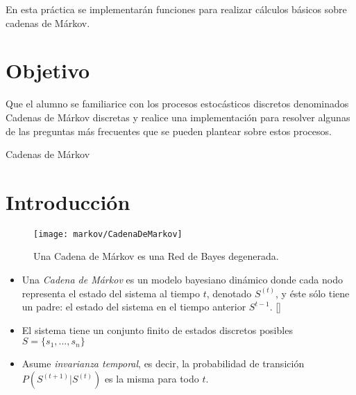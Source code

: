 
En esta práctica se implementarán funciones para realizar cálculos básicos sobre cadenas de Márkov.

\section{Objetivo}

\begin{compactitem}
 \item Que el alumno se familiarice con los procesos estocásticos discretos denominados Cadenas de Márkov discretas y realice una implementación para resolver algunas de las preguntas más frecuentes que se pueden plantear sobre estos procesos. \parencite{gestiondeoperaciones2015}
\end{compactitem}


\begin{auxcode}
 \caption{Cadenas de Márkov}
 \centering
\end{auxcode}


\section{Introducción}

\begin{figure}
 \centering
 \texttt{[image: markov/CadenaDeMarkov]}
 \caption{Una Cadena de Márkov es una Red de Bayes degenerada.}\label{Fig:CadenaDeMarkov}
\end{figure}

\begin{definition}
 \begin{itemize}
  \item Una \emph{Cadena de Márkov} es un modelo bayesiano dinámico donde cada nodo representa el estado del sistema al tiempo $t$, denotado $S^{(t)}$, y éste sólo tiene un padre: el estado del sistema en el tiempo anterior $S^{t-1}$. []

  \item El sistema tiene un conjunto finito de estados discretos posibles $S = \{s_1,...,s_n\}$

  \item Asume \emph{invarianza temporal}, es decir, la probabilidad de transición $P(S^{(t+1)}|S^{(t)})$ es la misma para todo $t$.
 \end{itemize}
\end{definition}

